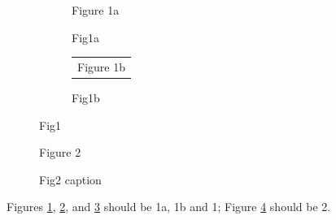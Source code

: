 \documentclass{article}
\begin{document}
\begin{figure}
  \begin{subfigure}{0.3\textwidth}
    Figure 1a
    \caption{Fig1a}
    \label{fig:1a}
  \end{subfigure}
  \hfill
  \begin{subfigure}{0.5\textwidth}
\begin{tabularx}{0.5\textwidth}{r}
Figure 1b
\end{tabularx}
    \caption{Fig1b}
    \label{fig:1b}
  \end{subfigure}
  \caption{Fig1}
  \label{fig:1}
\end{figure}

\begin{figure}
Figure 2
\caption{Fig2 caption}
\label{fig:2}
\end{figure}

Figures \ref{fig:1a}, \ref{fig:1b}, and \ref{fig:1} should be 1a, 1b
and 1; Figure \ref{fig:2} should be 2.
\end{document}
